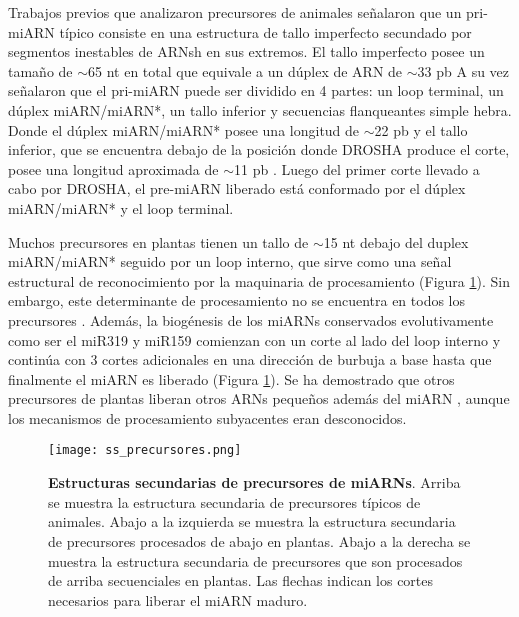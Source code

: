 Trabajos previos que analizaron precursores de animales señalaron que un pri-miARN típico consiste en una estructura de tallo imperfecto secundado por segmentos inestables de ARNsh en sus extremos.
El tallo imperfecto posee un tamaño de $\sim$65 nt en total que equivale a un dúplex de ARN de $\sim$33 pb  \citep{pmid16751099}
A su vez señalaron que el pri-miARN puede ser dividido en 4 partes: un loop terminal, un dúplex miARN/miARN*, un tallo inferior y secuencias flanqueantes simple hebra. 
Donde el dúplex miARN/miARN* posee una longitud de $\sim$22 pb y el tallo inferior, que se encuentra debajo de la posición donde DROSHA produce el corte, posee una longitud aproximada de $\sim$11 pb \citep{pmid16751099}.
Luego del primer corte llevado a cabo por DROSHA, el pre-miARN liberado está conformado por el dúplex miARN/miARN* y el loop terminal.


Muchos precursores en plantas tienen un tallo de $\sim$15 nt debajo del duplex miARN/miARN* seguido por un loop interno, que sirve como una señal estructural de reconocimiento por la maquinaria de procesamiento \citep{pmid17369351,pmid16751099,Mateos2010,pmid20015654} (Figura \ref{fig:ss_precursores}).
Sin embargo, este determinante de procesamiento no se encuentra en todos los precursores \citep{Mateos2010}.
Además, la biogénesis de los miARNs conservados evolutivamente como ser el miR319 y miR159 comienzan con un corte al lado del loop interno y continúa con 3 cortes adicionales en una dirección de burbuja a base hasta que finalmente el miARN es liberado \citep{Bologna2013,pmid19850910} (Figura \ref{fig:ss_precursores}).
Se ha demostrado que otros precursores de plantas liberan otros ARNs pequeños además del miARN \citep{pmid15314213,pmid20696037}, aunque los mecanismos de procesamiento subyacentes eran desconocidos.

\begin{figure}[htbp!] 
	\centering    
	\texttt{[image: ss\_precursores.png]}
	\caption[Estructuras  de precursores de miARNs]{
		\textbf{Estructuras secundarias de precursores de miARNs}.
        Arriba se muestra la estructura secundaria de precursores típicos de animales.
        Abajo a la izquierda se muestra la estructura secundaria de precursores procesados de abajo en plantas.
        Abajo a la derecha se muestra la estructura secundaria de precursores que son procesados de arriba secuenciales en plantas.
        Las flechas indican los cortes necesarios para liberar el miARN maduro.
    }
	\label{fig:ss_precursores}
\end{figure}


